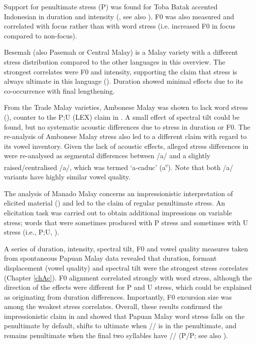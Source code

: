 Support for penultimate stress (P) was found for Toba Batak accented Indonesian in duration and intensity (\citealt{goedemans_stress_2007}, see also \citealt{vanheuven_effects_1997}). F0 was also measured and correlated with focus rather than with word stress (i.e. increased F0 in focus compared to non-focus). \par

Besemah (also Pasemah or Central Malay) is a Malay variety with a different stress distribution compared to the other languages in this overview. The strongest correlates were F0 and intensity, supporting the claim that stress is always ultimate in this language (\citealt{mcdonnell_acoustic_2016}). Duration showed minimal effects due to its co-occurrence with final lengthening.\par

From the Trade Malay varieties, Ambonese Malay was shown to lack word stress (\citealt{maskikit-essed_no_2016}), counter to the P;U (LEX) claim in \citet{vanminde_malayu_1997}. A small effect of spectral tilt could be found, but no systematic acoustic differences due to stress in duration or F0. The re-analysis of Ambonese Malay stress also led to a different claim with regard to its vowel inventory. Given the lack of acoustic effects, alleged stress differences in \citet{vanminde_malayu_1997} were re-analysed as segmental differences between /a/ and a slightly raised/centralised /a/, which was termed `a-caduc' (a\textsuperscript{c}). Note that both /a/ variants have highly similar vowel quality.\par

The analysis of Manado Malay concerns an impressionistic interpretation of elicited material (\citealt{stoel_focus_2005}) and led to the claim of regular penultimate stress. An elicitation task was carried out to obtain additional impressions on variable stress; words that were sometimes produced with P stress and sometimes with U stress (i.e., P;U, \citealt[16]{stoel_focus_2005}).\par

A series of duration, intensity, spectral tilt, F0 and vowel quality measures taken from spontaneous Papuan Malay data revealed that duration, formant displacement (vowel quality) and spectral tilt were the strongest stress correlates (Chapter \ref{chAc}). F0 alignment correlated strongly with word stress, although the direction of the effects were different for P and U stress, which could be explained as originating from duration differences. Importantly, F0 excursion size was among the weakest stress correlates. Overall, these results confirmed the impressionistic claim in \citet{kluge_grammar_2017} and showed that Papuan Malay word stress falls on the penultimate by default, shifts to ultimate when // is in the penultimate, and remains penultimate when the final two syllables have // (P/P; see also \citealt{kaland_stress_2019}). \par

